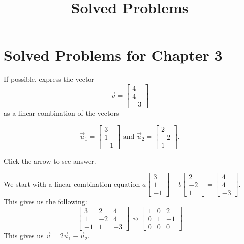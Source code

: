 \documentclass{ximera}
\title{Solved Problems} \license{CC BY-NC-SA 4.0}
\begin{document}
\begin{abstract}
\end{abstract}
\maketitle

\section*{Solved Problems for Chapter 3}

\begin{problem}\label{prb:3.3}
If possible, express the vector
\begin{equation*}
\vec{v}= 
\begin{bmatrix}
4 \\
4 \\
-3
\end{bmatrix}
\end{equation*}
as a linear combination of the vectors

\begin{equation*}
\vec{u}_1 = 
\begin{bmatrix}
3 \\
1 \\
-1
\end{bmatrix}
\mbox{ and  }
\vec{u}_2 =
\begin{bmatrix}
2 \\
-2\\
1
\end{bmatrix}.
\end{equation*}

Click the arrow to see answer.
\begin{expandable}
    We start with a linear combination equation $a\begin{bmatrix}3\\1\\-1\end{bmatrix}+b\begin{bmatrix}2\\-2\\1\end{bmatrix}=\begin{bmatrix}4\\4\\-3\end{bmatrix}$.  This gives us the following:
    $$\left[
\begin{array}{rr|r}
3 & 2 & 4 \\
1 & -2 & 4\\
-1 & 1 & -3
\end{array}
\right] \rightsquigarrow \left[
\begin{array}{rr|r}1& 0& 2\\
 0& 1 &-1\\
 0& 0& 0\end{array}
\right]$$
This gives us $\vec{v}=2\vec{u}_1 -\vec{u}_2$.
\end{expandable}
\end{problem}
\end{document}
